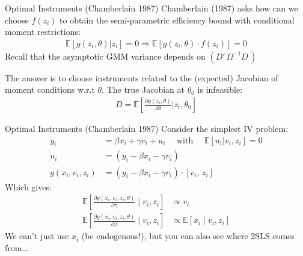 \begin{frame}{Optimal Instruments (Chamberlain 1987)}
Chamberlain (1987) asks how can we choose $f(z_i)$ to obtain the semi-parametric efficiency bound with conditional moment restrictions:
\begin{align*}
\mathbb{E}[g(z_i,\theta) | z_i]=0 \Rightarrow \mathbb{E}[g(z_i,\theta) \cdot f(z_i) ]=0 
\end{align*}
Recall that the asymptotic GMM variance depends on $(D'\, \Omega^{-1} D\,)$

The answer is to choose instruments related to the (expected) Jacobian of moment conditions w.r.t $\theta$. The true Jacobian at $\theta_0$ is \alert{infeasible}:
\begin{align*}
D=\mathbb{E}\left[\frac{\partial g(z_i,\theta)}{\partial \theta} | z_i, \theta_0 \right]
\end{align*}
\end{frame}


\begin{frame}{Optimal Instruments (Chamberlain 1987)}
Consider the simplest IV problem:
\begin{align*}
y_i &= \beta x_i + \gamma v_i + u_i \quad \text{ with } \quad \mathbb{E}[u_i | v_i, z_i] =0 \\
u_i &= \left(y_i - \beta x_i - \gamma v_i \right) \\
g(x_i,v_i,z_i) &= \left(y_i - \beta x_i - \gamma v_i \right) \cdot [v_i,\, z_i]
 \end{align*}
 Which gives:
\begin{align*}
\mathbb{E}\left[\frac{\partial g(x_i,v_i, z_i,\theta)}{\partial \gamma} \mid v_i, z_i \right] &\propto v_i\\
\mathbb{E}\left[\frac{\partial g(x_i,v_i, z_i,\theta)}{\partial \beta} \mid v_i, z_i \right] &
\propto \mathbb{E}\left[x_i \mid v_i, z_i \right]
\end{align*}
We can't just use $x_i$ (bc endogenous!), but you can also see where 2SLS comes from...
\end{frame}



